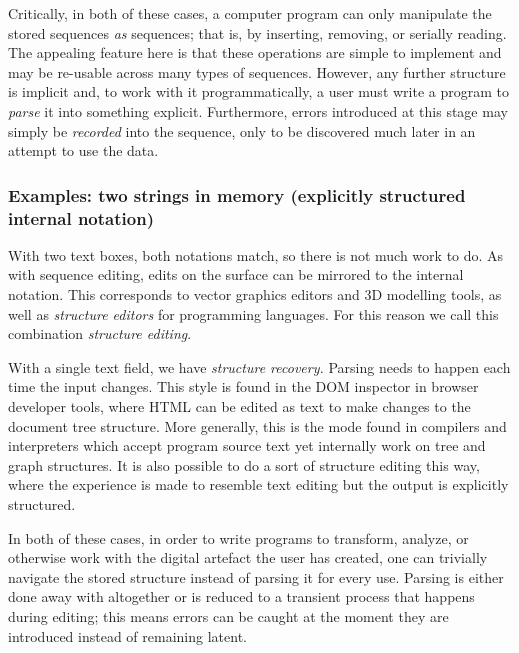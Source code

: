 \documentclass[english,submission]{programming}
\begin{document}
Critically, in both of these cases, a computer program can only
manipulate the stored sequences \emph{as} sequences; that is, by
inserting, removing, or serially reading. The appealing feature here is
that these operations are simple to implement and may be re-usable
across many types of sequences. However, any further structure is
implicit and, to work with it programmatically, a user must write a
program to \emph{parse} it into something explicit. Furthermore, errors
introduced at this stage may simply be \emph{recorded} into the
sequence, only to be discovered much later in an attempt to use the
data.

\hypertarget{examples-two-strings-in-memory-explicitly-structured-internal-notation}{%
\subsubsection{Examples: two strings in memory (explicitly structured
internal
notation)}\label{examples-two-strings-in-memory-explicitly-structured-internal-notation}}


With two text boxes, both notations match, so there is not much work to
do. As with sequence editing, edits on the surface can be mirrored to
the internal notation. This corresponds to vector graphics editors and
3D modelling tools, as well as \emph{structure editors} for programming
languages. For this reason we call this combination \emph{structure
editing}.

With a single text field, we have \emph{structure recovery.} Parsing
needs to happen each time the input changes. This style is found in the
DOM inspector in browser developer tools, where HTML can be edited as
text to make changes to the document tree structure. More generally,
this is the mode found in compilers and interpreters which accept
program source text yet internally work on tree and graph structures. It
is also possible to do a sort of structure editing this way, where the
experience is made to resemble text editing but the output is explicitly
structured.

In both of these cases, in order to write programs to transform,
analyze, or otherwise work with the digital artefact the user has
created, one can trivially navigate the stored structure instead of
parsing it for every use. Parsing is either done away with altogether or
is reduced to a transient process that happens during editing; this
means errors can be caught at the moment they are introduced instead of
remaining latent.
\end{document}
